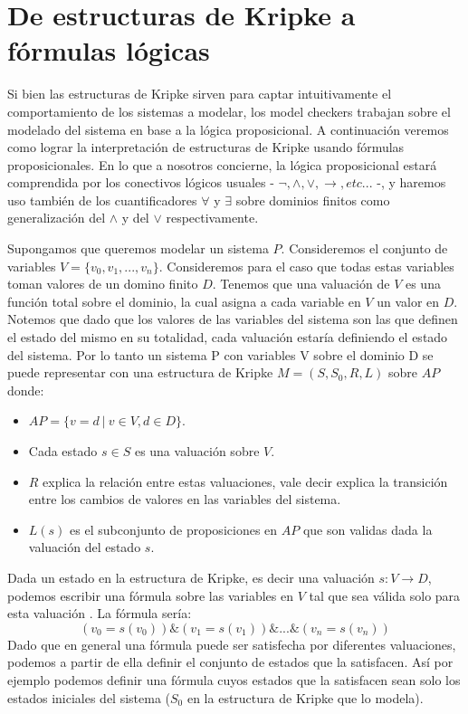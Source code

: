 \documentclass[titlepage, 12pt]{book}
\begin{document}



\section{De estructuras de Kripke a f\'ormulas l\'ogicas}


Si bien las estructuras de Kripke sirven para captar intuitivamente el comportamiento de los sistemas a modelar, los model checkers trabajan sobre el modelado del sistema en base a la l\'ogica proposicional. A continuaci\'on veremos como lograr la interpretaci\'on de estructuras de Kripke usando f\'ormulas proposicionales. En lo que a nosotros concierne, la l\'ogica proposicional estar\'a comprendida por los conectivos l\'ogicos usuales - $\neg,\wedge,\vee,\rightarrow,etc...$ -, y haremos uso tambi\'en de los cuantificadores $\forall$ y $\exists$ sobre dominios finitos como generalizaci\'on del $\wedge$ y del $\vee$ respectivamente.

Supongamos que queremos modelar un sistema $P$. Consideremos el conjunto de variables $V = \lbrace v_0,v_1,...,v_n \rbrace$. Consideremos para el caso que todas estas variables toman valores de un domino finito $D$. Tenemos que una valuaci\'on de $V$ es una funci\'on total sobre el dominio, la cual asigna a cada variable en $V$ un valor en $D$. Notemos que dado que los valores de las variables del sistema son las que definen el estado del mismo en su totalidad, cada valuaci\'on estar\'ia definiendo el estado del sistema. Por lo tanto un sistema P con variables V sobre el dominio D se puede representar con una estructura de Kripke $M = (S,S_0,R,L)$ sobre $AP$ donde:

\begin{itemize}
\item $AP = \{v=d~|~ v \in V, d \in D\}.$
\item Cada estado $s \in S$ es una valuaci\'on sobre $V$.
\item $R$ explica la relaci\'on entre estas valuaciones, vale decir explica la transici\'on entre los cambios de valores en las variables del sistema.
\item $L(s)$ es el subconjunto de proposiciones en $AP$ que son validas dada la valuaci\'on del estado $s$.
\end{itemize}

Dada un estado en la estructura de Kripke, es decir una valuaci\'on $s:V\rightarrow D$, podemos escribir una f\'ormula sobre las variables en $V$ tal que sea v\'alida solo para esta valuaci\'on \cite{Clarke}. La f\'ormula ser\'ia: $$(v_0 = s(v_0)) \& (v_1 = s(v_1)) \& ... \& (v_n = s(v_n))$$
Dado que en general una f\'ormula puede ser satisfecha por diferentes valuaciones, podemos a partir de ella definir el conjunto de estados que la satisfacen. As\'i por ejemplo podemos definir una f\'ormula cuyos estados que la satisfacen sean solo los estados iniciales del sistema ($S_0$ en la estructura de Kripke que lo modela).
\end{document}
